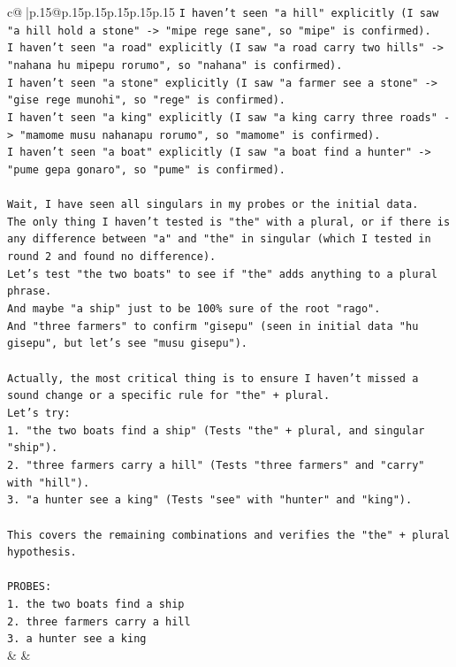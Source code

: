 \documentclass{article}
\begin{document}
{\begin{supertabular}{c@{$\;$}|p{.15\linewidth}@{}p{.15\linewidth}p{.15\linewidth}p{.15\linewidth}p{.15\linewidth}p{.15\linewidth}}
{{{\texttt{I haven't seen "a hill" explicitly (I saw "a hill hold a stone" {-}> "mipe rege sane", so "mipe" is confirmed).} \\
\texttt{I haven't seen "a road" explicitly (I saw "a road carry two hills" {-}> "nahana hu mipepu rorumo", so "nahana" is confirmed).} \\
\texttt{I haven't seen "a stone" explicitly (I saw "a farmer see a stone" {-}> "gise rege munohi", so "rege" is confirmed).} \\
\texttt{I haven't seen "a king" explicitly (I saw "a king carry three roads" {-}> "mamome musu nahanapu rorumo", so "mamome" is confirmed).} \\
\texttt{I haven't seen "a boat" explicitly (I saw "a boat find a hunter" {-}> "pume gepa gonaro", so "pume" is confirmed).} \\
\\ 
\texttt{Wait, I have seen all singulars in my probes or the initial data.} \\
\texttt{The only thing I haven't tested is "the" with a plural, or if there is any difference between "a" and "the" in singular (which I tested in round 2 and found no difference).} \\
\texttt{Let's test "the two boats" to see if "the" adds anything to a plural phrase.} \\
\texttt{And maybe "a ship" just to be 100\% sure of the root "rago".} \\
\texttt{And "three farmers" to confirm "gisepu" (seen in initial data "hu gisepu", but let's see "musu gisepu").} \\
\\ 
\texttt{Actually, the most critical thing is to ensure I haven't missed a sound change or a specific rule for "the" + plural.} \\
\texttt{Let's try:} \\
\texttt{1. "the two boats find a ship" (Tests "the" + plural, and singular "ship").} \\
\texttt{2. "three farmers carry a hill" (Tests "three farmers" and "carry" with "hill").} \\
\texttt{3. "a hunter see a king" (Tests "see" with "hunter" and "king").} \\
\\ 
\texttt{This covers the remaining combinations and verifies the "the" + plural hypothesis.} \\
\\ 
\texttt{PROBES:} \\
\texttt{1. the two boats find a ship} \\
\texttt{2. three farmers carry a hill} \\
\texttt{3. a hunter see a king} \\
            }
        }
    }
    & & \\ \\


\end{supertabular}}
\end{document}
